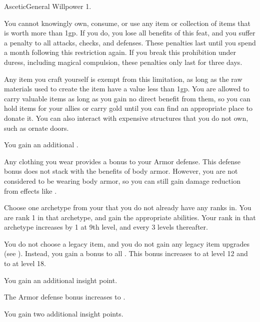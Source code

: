     \begin{feat}{Ascetic}{General}
        \featpre Willpower 1.

         You cannot knowingly own, consume, or use any item or collection of items that is worth more than 1gp.
        If you do, you lose all benefits of this feat, and you suffer a  penalty to all attacks, checks, and defenses.
        These penalties last until you spend a month following this restriction again.
        If you break this prohibition under duress, including magical compulsion, these penalties only last for three days.

        Any item you craft yourself is exempt from this limitation, as long as the raw materials used to create the item have a value less than 1gp.
        You are allowed to carry valuable items as long as you gain no direct benefit from them, so you can hold items for your allies or carry gold until you can find an appropriate place to donate it.
        You can also interact with expensive structures that you do not own, such as ornate doors.

         You gain an additional .

         Any clothing you wear provides a  bonus to your Armor defense.
        This defense bonus does not stack with the benefits of body armor.
        However, you are not considered to be wearing body armor, so you can still gain damage reduction from effects like .

         Choose one archetype from your  that you do not already have any
        ranks in.
        You are rank 1 in that archetype, and gain the appropriate abilities.
        Your rank in that archetype increases by 1 at 9th level, and every 3 levels thereafter.

         You do not choose a legacy item, and you do not gain any legacy item upgrades (see ).
        Instead, you gain a  bonus to all .
        This bonus increases to  at level 12 and to  at level 18.

         You gain an additional insight point.

         The Armor defense bonus increases to .

         You gain two additional insight points.
    \end{feat}

